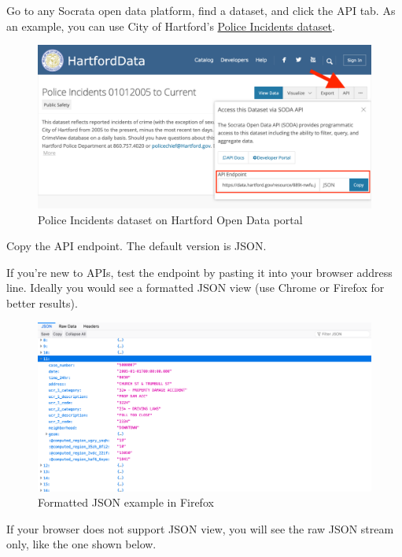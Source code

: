 \documentclass[
  english,
]{book}
\begin{document}
Go to any Socrata open data platform, find a dataset, and click the API tab. As an example, you can use City of Hartford's \href{https://data.hartford.gov/Public-Safety/Police-Incidents-01012005-to-Current/889t-nwfu}{Police Incidents dataset}.

\begin{figure}
\centering
\includegraphics{images/13-leaflet/data-hartford-api.png}
\caption{Police Incidents dataset on Hartford Open Data portal}
\end{figure}

Copy the API endpoint. The default version is JSON.

If you're new to APIs, test the endpoint by pasting it into your browser address line. Ideally you would see a formatted JSON view (use Chrome or Firefox for better results).

\begin{figure}
\centering
\includegraphics{images/13-leaflet/data-hartford-api-json.png}
\caption{Formatted JSON example in Firefox}
\end{figure}

If your browser does not support JSON view, you will see the raw JSON stream only, like the one shown below.
\end{document}
